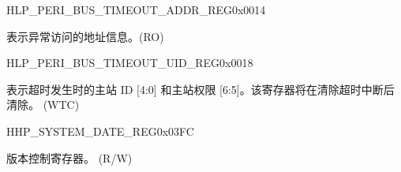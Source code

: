 \begin{register}{H}{LP\_PERI\_BUS\_TIMEOUT\_ADDR\_REG}{0x0014}\label{regdesc:LPPERIBUSTIMEOUTADDRREG}
%
\regnewline%
\begin{regdesc}\begin{reglist}
\label{fielddesc:LPPERIBUSTIMEOUTADDR}\item [LP\_PERI\_BUS\_TIMEOUT\_ADDR] 表示异常访问的地址信息。(RO)
\end{reglist}\end{regdesc}
\end{register}


\begin{register}{H}{LP\_PERI\_BUS\_TIMEOUT\_UID\_REG}{0x0018}\label{regdesc:LPPERIBUSTIMEOUTUIDREG}
%
%
\regnewline%
\begin{regdesc}\begin{reglist}
\label{fielddesc:LPPERIBUSTIMEOUTUID}\item [LP\_PERI\_BUS\_TIMEOUT\_UID] 表示超时发生时的主站 ID [4:0] 和主站权限 [6:5]。该寄存器将在清除超时中断后清除。 (WTC)
\end{reglist}\end{regdesc}
\end{register}



\begin{register}{H}{HP\_SYSTEM\_DATE\_REG}{0x03FC}\label{regdesc:HPSYSTEMDATEREG}
%
%
\regnewline%
\begin{regdesc}\begin{reglist}
\label{fielddesc:HPSYSTEMDATE}\item [HP\_SYSTEM\_DATE] 版本控制寄存器。 (R/W)
\end{reglist}\end{regdesc}
\end{register}


